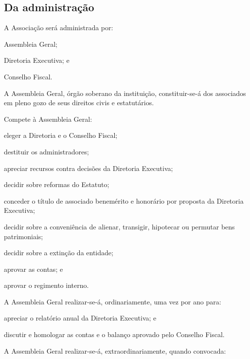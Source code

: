 \documentclass{estatuto}
\begin{document}
\begin{artigos}
		\section{Da administração}
			\item A Associação será administrada por:
				\begin{itens}
					\item Assembleia Geral;
					\item Diretoria Executiva; e
					\item Conselho Fiscal.
				\end{itens}
			\item A Assembleia Geral, órgão soberano da instituição, constituir-se-á dos associados em pleno gozo de seus direitos civis e estatutários.
			\item Compete à Assembleia Geral:
				\begin{itens}
					\item eleger a Diretoria e o Conselho Fiscal;
					\item destituir os administradores;
					\item apreciar recursos contra decisões da Diretoria Executiva;
					\item decidir sobre reformas do Estatuto;
					\item conceder o título de associado benemérito e honorário por proposta da Diretoria Executiva;
					\item decidir sobre a conveniência de alienar, transigir, hipotecar ou permutar bens patrimoniais;
					\item decidir sobre a extinção da entidade;
					\item aprovar as contas; e
					\item aprovar o regimento interno.
				\end{itens}
			\item A Assembleia Geral realizar-se-á, ordinariamente, uma vez por ano para:
				\begin{itens}
					\item apreciar o relatório anual da Diretoria Executiva; e
					\item discutir e homologar as contas e o balanço aprovado pelo Conselho Fiscal.
				\end{itens}
			\item A Assembleia Geral realizar-se-á, extraordinariamente, quando convocada:
				\begin{itens}

\end{itens}
\end{artigos}
\end{document}
